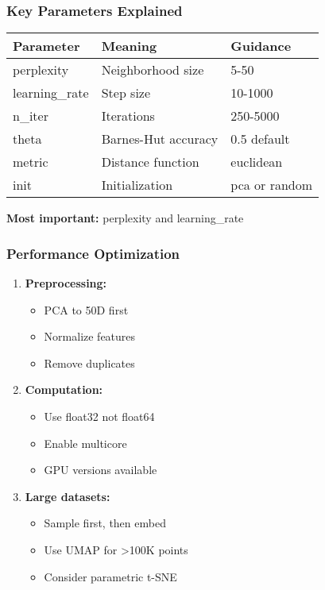 \documentclass[aspectratio=169]{beamer}
\begin{document}
\begin{frame}
\frametitle{Key Parameters Explained}

\begin{center}
\small
\begin{tabular}{l|l|l}
\textbf{Parameter} & \textbf{Meaning} & \textbf{Guidance}\\
\hline
perplexity & Neighborhood size & 5-50\\
learning\_rate & Step size & 10-1000\\
n\_iter & Iterations & 250-5000\\
theta & Barnes-Hut accuracy & 0.5 default\\
metric & Distance function & euclidean\\
init & Initialization & pca or random\\
\end{tabular}
\end{center}

\vspace{0.3cm}
\textbf{Most important:} perplexity and learning\_rate

\end{frame}

\begin{frame}
\frametitle{Performance Optimization}

\begin{enumerate}
\item \textbf{Preprocessing:}
\begin{itemize}
\item PCA to 50D first
\item Normalize features
\item Remove duplicates
\end{itemize}

\item \textbf{Computation:}
\begin{itemize}
\item Use float32 not float64
\item Enable multicore
\item GPU versions available
\end{itemize}

\item \textbf{Large datasets:}
\begin{itemize}
\item Sample first, then embed
\item Use UMAP for >100K points
\item Consider parametric t-SNE
\end{itemize}
\end{enumerate}

\end{frame}
\end{document}
